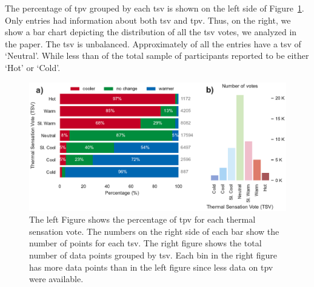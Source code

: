The percentage of \ac{tpv} grouped by each \ac{tsv} is shown on the left side of Figure~\ref{fig:bar_plot_tp_by_ts}.
Only  entries had information about both \ac{tsv} and \ac{tpv}.
Thus, on the right, we show a bar chart depicting the distribution of all the \ac{tsv} votes, we analyzed in the paper.
The \ac{tsv} is unbalanced. 
Approximately  of all the entries have a \ac{tsv} of `Neutral'.
While less than  of the total sample of participants reported to be either `Hot' or `Cold'.
\begin{figure}[htb!]
    \centering
    \includegraphics[width=\textwidth]{figures/bar_plot_tp_by_ts}
    \caption{The left Figure shows the percentage of \ac{tpv} for each thermal sensation vote.
    The numbers on the right side of each bar show the number of points for each \ac{tsv}.
    The right figure shows the total number of data points grouped by \ac{tsv}.
    Each bin in the right figure has more data points than in the left figure since less data on \ac{tpv} were available.}
    \label{fig:bar_plot_tp_by_ts}
\end{figure}

